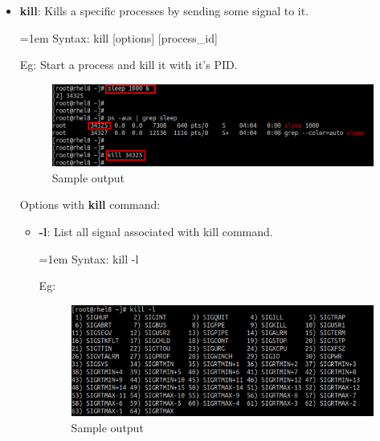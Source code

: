 \setlength{\columnsep}{3pt}
\begin{flushleft}
	\begin{itemize}
		\item \textbf{kill}: Kills a specific processes by sending some signal to it.
		\begin{tcolorbox}[breakable,notitle,boxrule=-0pt,colback=pink,colframe=pink]
			\color{black}
			\font=1em
			Syntax: kill [options] [process\_id]
			\font=4pt
		\end{tcolorbox}
		Eg: Start a process and kill it with it's PID.
			\begin{figure}[h!]
				\centering
				\includegraphics[scale=.3]{content/chapter12/images/kill1.png}
				\caption{Sample output}
				\label{fig:process23482}
			\end{figure}

		
		Options with \textbf{kill} command:	
		\begin{itemize}
			
			\item \textbf{-l}: List all signal associated with kill command.			
			\begin{tcolorbox}[breakable,notitle,boxrule=-0pt,colback=pink,colframe=pink]
				\color{black}
				\font=1em
				Syntax: kill -l
				\font=4pt
			\end{tcolorbox}
			Eg: 
			\begin{figure}[h!]
				\centering
				\includegraphics[scale=.3]{content/chapter12/images/kill2.png}
				\caption{Sample output}
				\label{fig:process2347}
			\end{figure}
			\newline
		

\end{itemize}
\end{itemize}
\end{flushleft}

